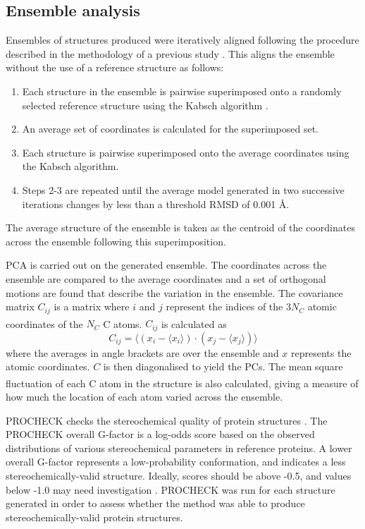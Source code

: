 \subsection{Ensemble analysis}

Ensembles of structures produced were iteratively aligned following the procedure described in the methodology of a previous study \cite{Bakan2009}.
This aligns the ensemble without the use of a reference structure as follows:

\begin{enumerate}
\item Each structure in the ensemble is pairwise superimposed onto a randomly selected reference structure using the Kabsch algorithm \cite{Kabsch1976}.
\item An average set of coordinates is calculated for the superimposed set.
\item Each structure is pairwise superimposed onto the average coordinates using the Kabsch algorithm.
\item Steps 2-3 are repeated until the average model generated in two successive iterations changes by less than a threshold RMSD of 0.001 \AA.
\end{enumerate}

The average structure of the ensemble is taken as the centroid of the coordinates across the ensemble following this superimposition.

PCA is carried out on the generated ensemble.
The coordinates across the ensemble are compared to the average coordinates and a set of orthogonal motions are found that describe the variation in the ensemble.
The covariance matrix $C_{ij}$ is a matrix where $i$ and $j$ represent the indices of the $3 N_{C}$ atomic coordinates of the $N_{C}$ C\textsuperscript{\textalpha} atoms.
$C_{ij}$ is calculated as
$$
C_{ij} = \langle (x_{i} - \langle x_{i} \rangle) \cdot (x_{j} - \langle x_{j} \rangle) \rangle
$$
where the averages in angle brackets are over the ensemble and $x$ represents the atomic coordinates.
$C$ is then diagonalised to yield the PCs.
The mean square fluctuation of each C\textsuperscript{\textalpha} atom in the structure is also calculated, giving a measure of how much the location of each atom varied across the ensemble.

PROCHECK checks the stereochemical quality of protein structures \cite{Laskowski1993}.
The PROCHECK overall G-factor is a log-odds score based on the observed distributions of various stereochemical parameters in reference proteins.
A lower overall G-factor represents a low-probability conformation, and indicates a less stereochemically-valid structure.
Ideally, scores should be above -0.5, and values below -1.0 may need investigation \cite{Esposito2006}.
PROCHECK was run for each structure generated in order to assess whether the method was able to produce stereochemically-valid protein structures.


